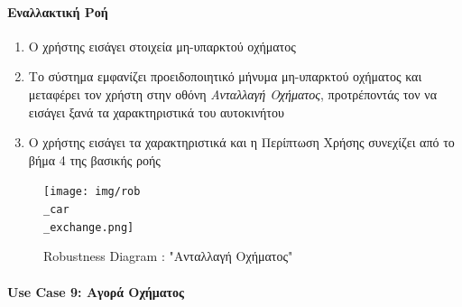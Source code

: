 \documentclass{../ol-softwaremanual}
\begin{document}
	\paragraph{{Εναλλακτική Ροή}}
	
	\begin{enumerate}
		\item Ο χρήστης εισάγει στοιχεία μη-υπαρκτού οχήματος
		\item Το σύστημα εμφανίζει προειδοποιητικό μήνυμα μη-υπαρκτού οχήματος και μεταφέρει τον χρήστη στην οθόνη \textit{Ανταλλαγή Οχήματος}, προτρέποντάς τον να εισάγει ξανά τα χαρακτηριστικά του αυτοκινήτου
		\item Ο χρήστης εισάγει τα χαρακτηριστικά και η Περίπτωση Χρήσης συνεχίζει από το βήμα 4 της βασικής ροής
	\end{enumerate}

	\newpage
	
	\begin{figure}[htbp!]
		\texttt{[image: img/rob\\\_car\\\_exchange.png]}
		\caption{\en Robustness Diagram : "\gr Ανταλλαγή Οχήματος\en"\gr\protect\footnotemark[3]}
	\end{figure}


	
	
	
	\newpage
	\centering
	
	\paragraph{\en Use Case 9: \gr Αγορά Οχήματος\gr}
\end{document}
